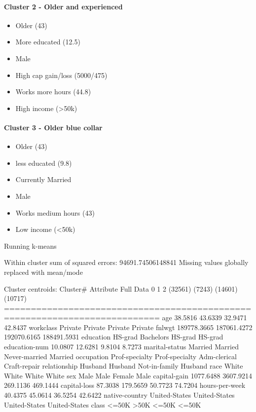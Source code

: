 \documentclass{sig-alternate}
\begin{document}
\paragraph{Cluster 2 - Older and experienced}
\begin{itemize}[itemsep=1pt]
    \item Older (43)
    \item More educated (12.5)
    \item Male
    \item High cap gain/loss (5000/475)
    \item Works more hours (44.8)
    \item High income (>50k)
\end{itemize}

\paragraph{Cluster 3 - Older blue collar}
\begin{itemize}[itemsep=1pt]
    \item Older (43)
    \item less educated (9.8)
    \item Currently Married
    \item Male
    \item Works medium hours (43)
    \item Low income (<50k)
\end{itemize}



\tiny
\begin{verbbox}
Running k-means

Within cluster sum of squared errors: 94691.74506148841
Missing values globally replaced with mean/mode

Cluster centroids:
                                     Cluster#
Attribute           Full Data               0              1              2
                      (32561)          (7243)        (14601)        (10717)
===========================================================================
age                   38.5816         43.6339        32.9471        42.8437
workclass             Private         Private        Private        Private
fnlwgt            189778.3665     187061.4272    192070.6165    188491.5931
education             HS-grad       Bachelors        HS-grad        HS-grad
education-num         10.0807         12.6281         9.8104         8.7273
marital-status        Married         Married  Never-married        Married
occupation     Prof-specialty  Prof-specialty   Adm-clerical   Craft-repair
relationship          Husband         Husband  Not-in-family        Husband
race                    White           White          White          White
sex                      Male            Male         Female           Male
capital-gain        1077.6488       3607.9214       269.1136       469.1444
capital-loss          87.3038        179.5659        50.7723        74.7204
hours-per-week        40.4375         45.0614        36.5254        42.6422
native-country  United-States   United-States  United-States  United-States
class                   <=50K            >50K          <=50K          <=50K
\end{verbbox}
\normalsize
\end{document}
